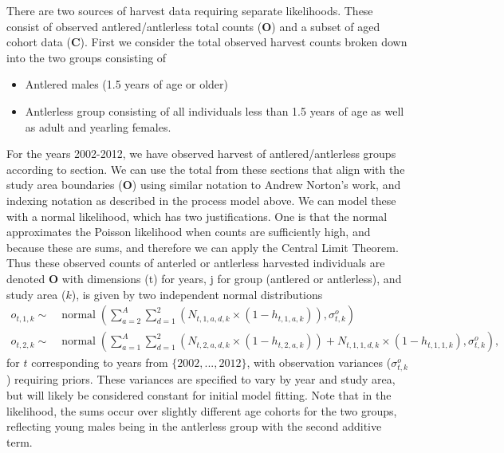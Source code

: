 \documentclass[12pt]{article}\usepackage[]{graphicx}\usepackage[]{color}
\DeclareMathOperator{\dnorm}{normal}
\begin{document}
There are two sources of harvest data requiring separate likelihoods. These consist of observed antlered/antlerless total counts ($\bm{O}$) and a subset of aged cohort data ($\bm{C}$). First we consider the total observed harvest counts broken down into the two groups consisting of 
  \begin{itemize}
    \item Antlered males (1.5 years of age or older)
    \item Antlerless group consisting of all individuals less than 1.5 years of age as well as adult and yearling females.
  \end{itemize}
\noindent For the years 2002-2012, we have observed harvest of antlered/antlerless groups according to section. We can use the total from these sections that align with the study area boundaries ($\bm{O}$) using similar notation to Andrew Norton's work, and indexing notation as described in the process model above. We can model these with a normal likelihood, which has two justifications. One is that the normal approximates the Poisson likelihood when counts are sufficiently high, and because these are sums, and therefore we can apply the Central Limit Theorem. Thus these observed counts of anterled or antlerless harvested individuals are denoted $\bm{O}$ with dimensions (t) for years, j for group (antlered or antlerless), and study area ($k$), is given by two independent normal distributions 
    \begin{align}
        o_{t,1,k} \sim & \dnorm(\sum_{a=2}^A \sum_{d=1}^2 \left(N_{t,1,a,d,k}\times(1-h_{t,1,a,k})\right),\sigma_{t,k}^o)\\
        o_{t,2,k} \sim & \dnorm(\sum_{a=1}^A \sum_{d=1}^2 \left(N_{t,2,a,d,k}\times(1-h_{t,2,a,k})\right) + N_{t,1,1,d,k}\times(1-h_{t,1,1,k}),\sigma_{t,k}^o),
    \end{align}
\noindent for $t$ corresponding to years from $\{2002,...,2012\}$, with observation variances ($\sigma_{t,k}^o$) requiring priors. These variances are specified to vary by year and study area, but will likely be considered constant for initial model fitting. Note that in the likelihood, the sums occur over slightly different age cohorts for the two groups, reflecting young males being in the antlerless group with the second additive term. 
\end{document}
